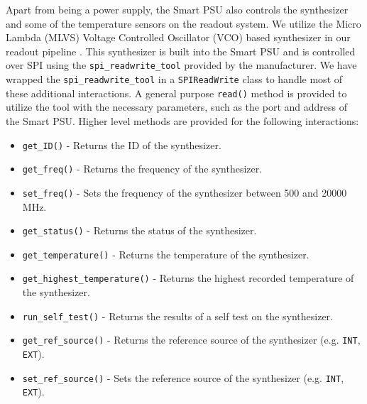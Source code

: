 Apart from being a power supply, the Smart PSU also controls the synthesizer and some of the temperature sensors on the readout system. 
We utilize the Micro Lambda (MLVS) Voltage Controlled Oscillator (VCO) based synthesizer in our readout pipeline \parencite{mlvs}. 
This synthesizer is built into the Smart PSU and is controlled over SPI using the \texttt{spi\_readwrite\_tool} provided by the manufacturer.
We have wrapped the \texttt{spi\_readwrite\_tool} in a \texttt{SPIReadWrite} class to handle most of these additional interactions.
A general purpose \texttt{read()} method is provided to utilize the tool with the necessary parameters, such as the port and address of the Smart PSU.
Higher level methods are provided for the following interactions:
\begin{itemize}
    \item \texttt{get\_ID()} - Returns the ID of the synthesizer.
    \item \texttt{get\_freq()} - Returns the frequency of the synthesizer.
    \item \texttt{set\_freq()} - Sets the frequency of the synthesizer between 500 and 20000 MHz.
    \item \texttt{get\_status()} - Returns the status of the synthesizer.
    \item \texttt{get\_temperature()} - Returns the temperature of the synthesizer.
    \item \texttt{get\_highest\_temperature()} - Returns the highest recorded temperature of the synthesizer.
    \item \texttt{run\_self\_test()} - Returns the results of a self test on the synthesizer.
    \item \texttt{get\_ref\_source()} - Returns the reference source of the synthesizer (e.g. \texttt{INT}, \texttt{EXT}).
    \item \texttt{set\_ref\_source()} - Sets the reference source of the synthesizer (e.g. \texttt{INT}, \texttt{EXT}).
\end{itemize}

